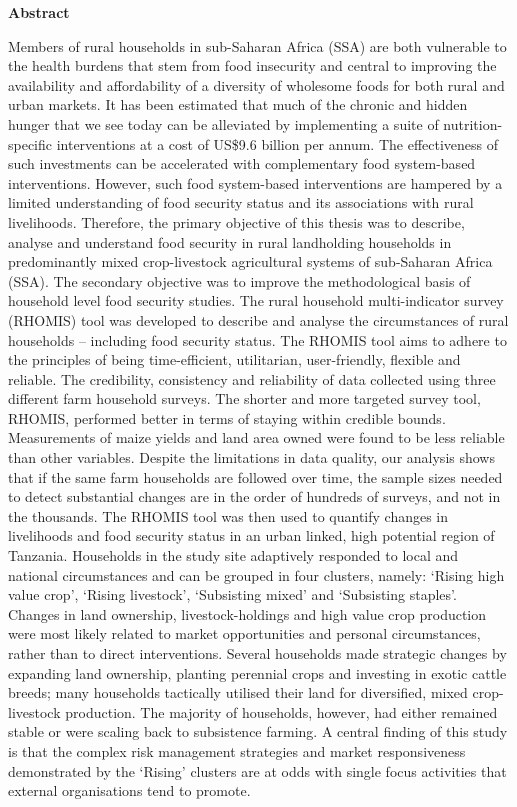 \thispagestyle{empty}

\textbf{Abstract}

\small
Members of rural households in sub-Saharan Africa (SSA) are both vulnerable to the health burdens that stem from food insecurity and central to improving the availability and affordability of a diversity of wholesome foods for both rural and urban markets. It has been estimated that much of the chronic and hidden hunger that we see today can be alleviated by implementing a suite of nutrition-specific interventions at a cost of US\$9.6 billion per annum. The effectiveness of such investments can be accelerated with complementary food system-based interventions. However, such food system-based interventions are hampered by a limited understanding of food security status and its associations with rural livelihoods. Therefore, the primary objective of this thesis was to describe, analyse and understand food security in rural landholding households in predominantly mixed crop-livestock agricultural systems of sub-Saharan Africa (SSA). The secondary objective was to improve the methodological basis of household level food security studies.
The rural household multi-indicator survey (RHOMIS) tool was developed to describe and analyse the circumstances of rural households -- including food security status. The RHOMIS tool aims to adhere to the principles of being time-efficient, utilitarian, user-friendly, flexible and reliable. The credibility, consistency and reliability of data collected using three different farm household surveys. The shorter and more targeted survey tool, RHOMIS, performed better in terms of staying within credible bounds. Measurements of maize yields and land area owned were found to be less reliable than other variables. Despite the limitations in data quality, our analysis shows that if the same farm households are followed over time, the sample sizes needed to detect substantial changes are in the order of hundreds of surveys, and not in the thousands.
The RHOMIS tool was then used to quantify changes in livelihoods and food security status in an urban linked, high potential region of Tanzania. Households in the study site adaptively responded to local and national circumstances and can be grouped in four clusters, namely: `Rising high value crop', `Rising livestock', `Subsisting mixed' and `Subsisting staples'. Changes in land ownership, livestock-holdings and high value crop production were most likely related to market opportunities and personal circumstances, rather than to direct interventions. Several households made strategic changes by expanding land ownership, planting perennial crops and investing in exotic cattle breeds; many households tactically utilised their land for diversified, mixed crop-livestock production. The majority of households, however, had either remained stable or were scaling back to subsistence farming. A central finding of this study is that the complex risk management strategies and market responsiveness demonstrated by the `Rising' clusters are at odds with single focus activities that external organisations tend to promote.
